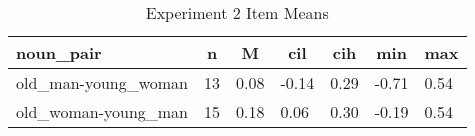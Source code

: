


\begin{table}[tbp]

\begin{center}
\begin{threeparttable}

\caption{\label{tab:r2-g-by-item-table-s2}Experiment 2 Item Means}

\begin{tabular}{lllllll}
\toprule
noun\_pair & \multicolumn{1}{c}{n} & \multicolumn{1}{c}{M} & \multicolumn{1}{c}{cil} & \multicolumn{1}{c}{cih} & \multicolumn{1}{c}{min} & \multicolumn{1}{c}{max}\\
\midrule
old\_man-young\_woman & 13 & 0.08 & -0.14 & 0.29 & -0.71 & 0.54\\
old\_woman-young\_man & 15 & 0.18 & 0.06 & 0.30 & -0.19 & 0.54\\
\bottomrule
\end{tabular}

\end{threeparttable}
\end{center}

\end{table}



